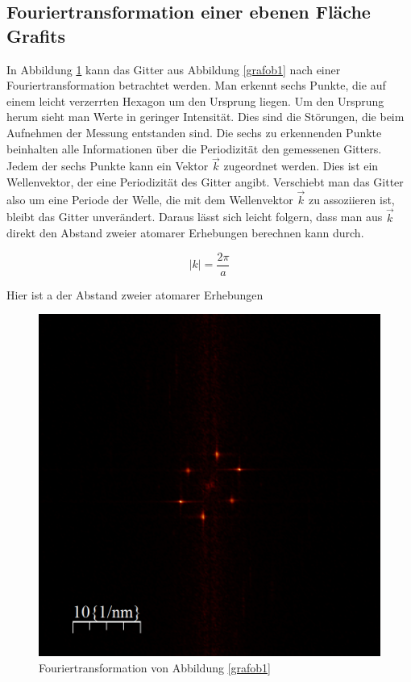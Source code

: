 \documentclass[10pt,a4paper]{article}
\begin{document}
\subsection{Fouriertransformation einer ebenen Fläche Grafits}

In Abbildung \ref{fouriertansformation_ebene} kann das Gitter aus Abbildung \ref{grafob1} nach einer Fouriertransformation betrachtet werden. Man erkennt sechs Punkte, die auf einem leicht verzerrten Hexagon um den Ursprung liegen. Um den Ursprung herum sieht man Werte in geringer Intensität. Dies sind die Störungen, die beim Aufnehmen der Messung entstanden sind. Die sechs zu erkennenden Punkte beinhalten alle Informationen über die Periodizität den gemessenen Gitters. Jedem der sechs Punkte kann ein Vektor $\vec{k}$ zugeordnet werden. Dies ist ein Wellenvektor, der eine Periodizität des Gitter angibt. Verschiebt man das Gitter also um eine Periode der Welle, die mit dem Wellenvektor $\vec{k}$ zu assoziieren ist, bleibt das Gitter unverändert. Daraus lässt sich leicht folgern, dass man aus $\vec{k}$ direkt den Abstand zweier atomarer Erhebungen berechnen kann durch.

\begin{equation}
	|k| = \frac{2\pi}{a}
	\label{formelk}
\end{equation}

Hier ist a der Abstand zweier atomarer Erhebungen

\begin{figure}[h]
	\centering
	
	\includegraphics[scale = 0.5]{Fouriertrasformation_kristall.png}
	
	\caption{Fouriertransformation von Abbildung \ref{grafob1}}
	\label{fouriertansformation_ebene}
\end{figure}
\end{document}
